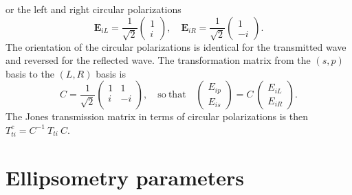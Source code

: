 or the left and right circular polarizations 
$$
\mathbf{E}_{iL} = \frac{1}{\sqrt{2}} \begin{pmatrix} 1 \\ i \end{pmatrix},
\quad
\mathbf{E}_{iR} = \frac{1}{\sqrt{2}} \begin{pmatrix} 1 \\ -i \end{pmatrix}.
$$
The orientation of the circular polarizations is identical for the transmitted wave and reversed for the reflected wave.
The transformation matrix from the $(s,p)$ basis to the $(L,R)$ basis is 
$$
C = \frac{1}{\sqrt{2}} 
\begin{pmatrix} 
1 &  1 \\ 
i & -i \\ 
\end{pmatrix},
\quad\mathrm{so\ that}\quad
\begin{pmatrix} E_{ip} \\ E_{is} \end{pmatrix}
= C\  
\begin{pmatrix} E_{iL} \\ E_{iR} \end{pmatrix}
.
$$
The Jones transmission matrix in terms of circular polarizations is then
$T^c_{ti} = C^{-1}\ T_{ti}\ C$.

\section{Ellipsometry parameters}

